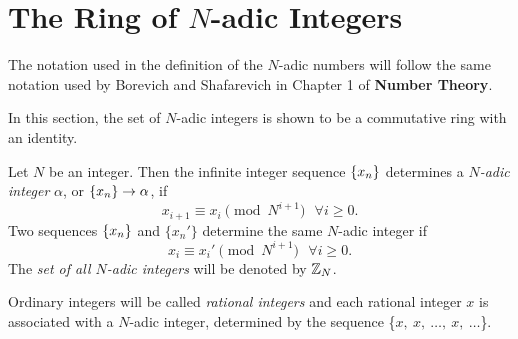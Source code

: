 \section{The Ring of $N$-adic Integers}
\par The notation used in the definition of the $N$-adic numbers will follow
the same notation used by Borevich and Shafarevich in Chapter 1 of
{\bf Number Theory}.

\par In this section, the set of $N$-adic integers is shown to be a
commutative ring with an identity.
  
\begin{definition}
\label{def:N-adic}
  Let $N$ be an integer. Then the infinite integer sequence $\{x_n\}$
  determines a {\em $N$-adic integer} $\alpha$, or $\{x_n\} \rightarrow \alpha$, if
\begin{equation} \label{eq:seq}
  x_{i+1} \equiv x_i \pmod{N^{i+1}} \ \ \ \forall i \geq 0.
\end{equation}
  Two sequences $\{x_n\}$ and $\{x_n'\}$ determine the same $N$-adic integer
  if 
\begin{equation} \label{eq:equiv}
  x_i \equiv x_i' \pmod{N^{i+1}}\ \ \ \forall i \geq 0.
\end{equation}
  The {\em set of all $N$-adic integers} will be denoted by $\mathbb{Z}_N$.
\end{definition}

\par Ordinary integers will be called {\em rational integers} and each
rational integer $x$ is associated with a $N$-adic integer, determined
by the sequence \{$x,\ x, \ \dots, \ x,\ \dots$\}.
	
